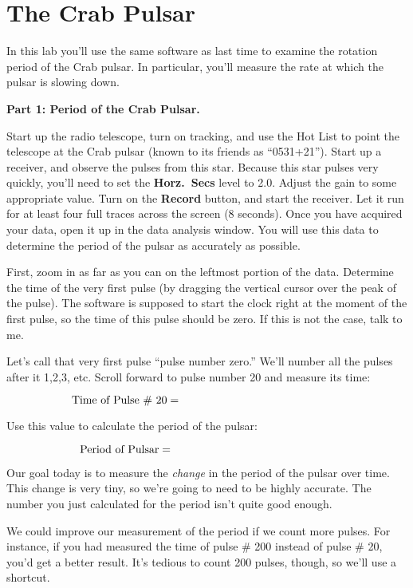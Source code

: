 \section{The Crab Pulsar}

\makelabheader

In this lab you'll use the same software as last time to examine the 
rotation period of the Crab pulsar.  In particular, you'll measure the
rate at which the pulsar is slowing down.
\bigskip\bigskip

{\bf Part 1: Period of the Crab Pulsar.}

Start up the radio telescope, turn on tracking, and use the Hot List to
point the telescope at the Crab pulsar (known to its friends as ``0531+21'').
Start up a receiver, and observe the pulses from this star.  Because this star
pulses very quickly, you'll need to set the {\bf Horz.\ Secs} level to 2.0.
Adjust the gain to some appropriate value.  Turn on the {\bf Record} button,
and start the receiver.  Let it run for at least four full traces across
the screen (8 seconds).  Once you have acquired your data, open it up
in the data analysis window.  You will use this data to determine the
period of the pulsar as accurately as possible.

First, zoom in as far as you can on the leftmost portion of the data.
Determine the time of the very first pulse (by dragging the vertical
cursor over the peak of the pulse).  The software is supposed to start
the clock right at the moment of the first pulse, so the time of this pulse
should be zero.  If this is not the case, talk to me.

Let's call that very first pulse ``pulse number zero.''  We'll
number all the pulses after it 1,2,3, etc.
Scroll forward to pulse number 20 and measure its time:

\medskip
$$
\mbox{Time of Pulse \# 20}=\hbox to 2in{}
$$
\medskip

Use this value to calculate the period of the pulsar:

\medskip
$$
\mbox{Period of Pulsar}=\hbox to 2in{}
$$
\medskip

Our goal today is to measure the {\it change} in the period
of the pulsar over time.  This change is very tiny, so we're going to
need to be highly accurate.  The number you just calculated for the period
isn't quite good enough.  

We could improve our measurement of the period if we count more pulses.
For instance, if you had measured the time of pulse \# 200 instead
of pulse \# 20, you'd get a better result.  It's tedious to count
200 pulses, though, so we'll use a shortcut.

